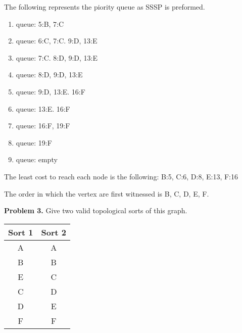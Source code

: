 \documentclass{article}
\begin{document}
The following represents the piority queue as SSSP is preformed.

\begin{enumerate}
    \item queue: 5:B, 7:C 
    \item queue: 6:C, 7:C. 9:D, 13:E
    \item queue: 7:C. 8:D, 9:D, 13:E
    \item queue: 8:D, 9:D, 13:E
    \item queue: 9:D, 13:E. 16:F
    \item queue: 13:E. 16:F
    \item queue: 16:F, 19:F
    \item queue: 19:F
    \item queue: empty
\end{enumerate}

The least cost to reach each node is the following: B:5, C:6, D:8, E:13, F:16

The order in which the vertex are first witnessed is B, C, D, E, F.

\vspace*{10mm}\par\textbf{Problem 3.} Give two valid topological sorts of this graph.\par



\begin{center}
    \begin{tabular}{||c c||} 
     \hline
     Sort 1 & Sort 2\\ [0.5ex] 
     \hline\hline
     A & A  \\ 
     \hline
     B & B \\
     \hline
     E & C \\
     \hline
     C & D  \\
     \hline
     D & E \\  
     \hline
     F & F \\ [1ex] 
     \hline
    \end{tabular}
\end{center}
\end{document}
